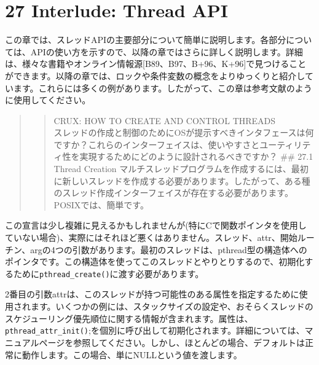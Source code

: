 \newpage

\hypertarget{interlude-thread-api}{%
\section*{27 Interlude: Thread API}\label{interlude-thread-api}}

この章では、スレッドAPIの主要部分について簡単に説明します。各部分については、APIの使い方を示すので、以降の章ではさらに詳しく説明します。詳細は、様々な書籍やオンライン情報源{[}B89、B97、B+96、K+96{]}で見つけることができます。以降の章では、ロックや条件変数の概念をよりゆっくりと紹介しています。これらには多くの例があります。したがって、この章は参考文献のように使用してください。

\begin{quote}
\begin{quote}
CRUX: HOW TO CREATE AND CONTROL THREADS\\
スレッドの作成と制御のためにOSが提示すべきインタフェースは何ですか？これらのインターフェイスは、使いやすさとユーティリティ性を実現するためにどのように設計されるべきですか？
\#\# 27.1 Thread Creation
マルチスレッドプログラムを作成するには、最初に新しいスレッドを作成する必要があります。したがって、ある種のスレッド作成インターフェイスが存在する必要があります。POSIXでは、簡単です。
\end{quote}
\end{quote}

\begin{Shaded}
\begin{Highlighting}[]
                \NormalTok{*),}
\end{Highlighting}
\end{Shaded}

この宣言は少し複雑に見えるかもしれませんが(特にCで関数ポインタを使用していない場合)、実際にはそれほど悪くはありません。スレッド、attr、開始ルーチン、argの4つの引数があります。最初のスレッドは、pthread型の構造体へのポインタです。この構造体を使ってこのスレッドとやりとりするので、初期化するために\texttt{pthread\_create()}に渡す必要があります。

2番目の引数attrは、このスレッドが持つ可能性のある属性を指定するために使用されます。いくつかの例には、スタックサイズの設定や、おそらくスレッドのスケジューリング優先順位に関する情報が含まれます。属性は、\texttt{pthread\_attr\_init()};を個別に呼び出して初期化されます。詳細については、マニュアルページを参照してください。しかし、ほとんどの場合、デフォルトは正常に動作します。この場合、単にNULLという値を渡します。

